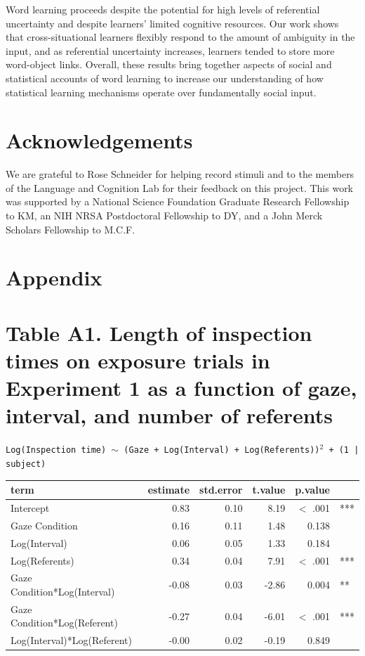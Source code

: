 \documentclass[authoryear, review]{elsarticle}
\begin{document}
Word learning proceeds despite the potential for high levels of
referential uncertainty and despite learners' limited cognitive
resources. Our work shows that cross-situational learners flexibly
respond to the amount of ambiguity in the input, and as referential
uncertainty increases, learners tended to store more word-object links.
Overall, these results bring together aspects of social and statistical
accounts of word learning to increase our understanding of how
statistical learning mechanisms operate over fundamentally social input.

\newpage

\section{Acknowledgements}\label{acknowledgements}

We are grateful to Rose Schneider for helping record stimuli and to the
members of the Language and Cognition Lab for their feedback on this
project. This work was supported by a National Science Foundation
Graduate Research Fellowship to KM, an NIH NRSA Postdoctoral Fellowship
to DY, and a John Merck Scholars Fellowship to M.C.F.

\newpage

\section*{Appendix}

\captionsetup[table]{labelformat=empty}

\section*{Table A1. Length of inspection times on exposure trials in Experiment 1 as a function of gaze, interval, and number of referents}

\texttt{Log(Inspection time) $\sim$ (Gaze + Log(Interval) + Log(Referents))$^2$ + (1 | subject)}

\begin{table}[h]
\centering
\begin{tabular}{lrrrrl}
 term & estimate & std.error & t.value & p.value &  \\ 
  \hline
Intercept & 0.83 & 0.10 & 8.19 & $<$ .001 & *** \\ 
  Gaze Condition & 0.16 & 0.11 & 1.48 & 0.138 &  \\ 
  Log(Interval) & 0.06 & 0.05 & 1.33 & 0.184 &  \\ 
  Log(Referents) & 0.34 & 0.04 & 7.91 & $<$ .001 & *** \\ 
  Gaze Condition*Log(Interval) & -0.08 & 0.03 & -2.86 & 0.004 & ** \\ 
  Gaze Condition*Log(Referent) & -0.27 & 0.04 & -6.01 & $<$ .001 & *** \\ 
  Log(Interval)*Log(Referent) & -0.00 & 0.02 & -0.19 & 0.849 &  \\ 
   \hline
\end{tabular}
\label{tab:e1_rt}
\end{table}
\end{document}
